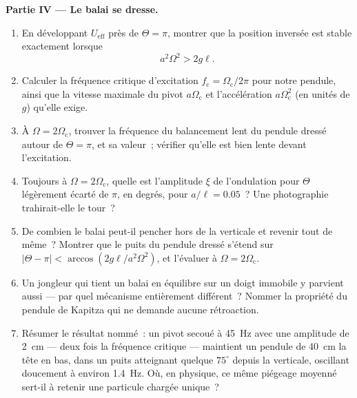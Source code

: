 \begin{problem}
\medskip\noindent\textbf{Partie IV --- Le balai se dresse.}
\begin{enumerate}[resume]
  \item En développant $U_{\text{eff}}$ près de $\Theta = \pi$, montrer
        que la position inversée est stable exactement lorsque
        \[
        a^2\Omega^2 > 2g\ell .
        \]
  \item Calculer la fréquence critique d'excitation $f_{\text{c}} =
        \Omega_{\text{c}}/2\pi$ pour notre pendule, ainsi que la
        vitesse maximale du pivot $a\Omega_{\text{c}}$ et
        l'accélération $a\Omega_{\text{c}}^2$ (en unités de $g$)
        qu'elle exige.
  \item À $\Omega = 2\Omega_{\text{c}}$, trouver la fréquence du
        balancement lent du pendule dressé autour de $\Theta = \pi$, et
        sa valeur~; vérifier qu'elle est bien lente devant
        l'excitation.
  \item Toujours à $\Omega = 2\Omega_{\text{c}}$, quelle est
        l'amplitude $\xi$ de l'ondulation pour $\Theta$ légèrement
        écarté de $\pi$, en degrés, pour $a/\ell = 0.05$~? Une
        photographie trahirait-elle le tour~?
  \item De combien le balai peut-il pencher hors de la verticale et
        revenir tout de même~? Montrer que le puits du pendule dressé
        s'étend sur $|\Theta - \pi| <
        \arccos(2g\ell/a^2\Omega^2)$, et l'évaluer à $\Omega =
        2\Omega_{\text{c}}$.
  \item Un jongleur qui tient un balai en équilibre sur un doigt
        immobile y parvient aussi --- par quel mécanisme entièrement
        différent~? Nommer la propriété du pendule de Kapitza qui ne
        demande aucune rétroaction.
  \item Résumer le résultat nommé~: un pivot secoué à \qty{45}{Hz} avec
        une amplitude de \qty{2}{cm} --- deux fois la fréquence
        critique --- maintient un pendule de \qty{40}{cm} la tête en
        bas, dans un puits atteignant quelque $75^\circ$ depuis la
        verticale, oscillant doucement à environ \qty{1.4}{Hz}. Où, en
        physique, ce même piégeage moyenné sert-il à retenir une
        particule chargée unique~?
\end{enumerate}
\end{problem}
